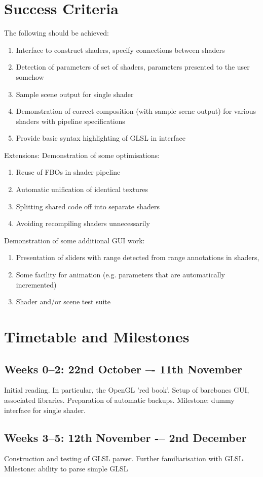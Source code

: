 \section*{Success Criteria}
The following should be achieved:
\begin{enumerate}
\item Interface to construct shaders, specify connections between shaders
\item Detection of parameters of set of shaders, parameters presented to the user somehow
\item Sample scene output for single shader
\item Demonstration of correct composition (with sample scene output) for various shaders with
pipeline specifications
\item Provide basic syntax highlighting of GLSL in interface
\end{enumerate}
Extensions:
Demonstration of some optimisations:
\begin{enumerate}
\item Reuse of FBOs in shader pipeline
\item Automatic unification of identical textures
\item Splitting shared code off into separate shaders
\item Avoiding recompiling shaders unnecessarily
\end{enumerate}
Demonstration of some additional GUI work:
\begin{enumerate}
\item Presentation of sliders with range detected from range annotations in shaders,
\item Some facility for animation (e.g. parameters that are automatically incremented)
\item Shader and/or scene test suite
\end{enumerate}

\section*{Timetable and Milestones}
\subsection*{Weeks 0--2: 22nd October –- 11th November}
Initial reading. In particular, the OpenGL 'red book'. Setup of barebones GUI, associated libraries.
Preparation of automatic backups.
Milestone: dummy interface for single shader.
\subsection*{Weeks 3--5: 12th November -– 2nd December}
Construction and testing of GLSL parser. Further familiarisation with GLSL.
Milestone: ability to parse simple GLSL
